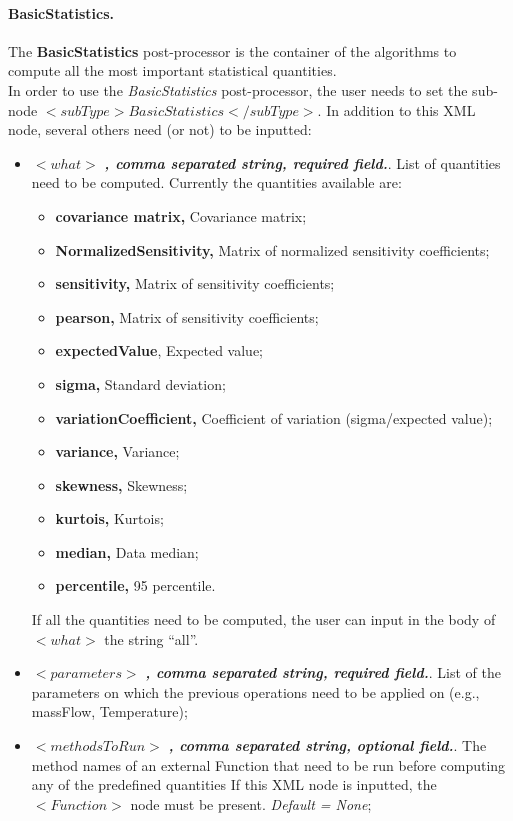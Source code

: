 \paragraph{BasicStatistics.}
\label{BasicStatistics}
The \textbf{BasicStatistics} post-processor is the container of the algorithms to compute all the most important statistical quantities. 
\\In order to use the   \textit{BasicStatistics} post-processor, the user needs to set the sub-node $<subType>BasicStatistics</subType>$. In addition to this XML node, several others need (or not) to be inputted:
\begin{itemize}
\item $<what>$ \textbf{\textit{, comma separated string, required field.}}.  List of quantities need to be computed. Currently the quantities available are:
\begin{itemize}
   \item \textbf{covariance matrix,} Covariance matrix;
   \item \textbf{NormalizedSensitivity,} Matrix of normalized sensitivity coefficients;
   \item \textbf{sensitivity,} Matrix of sensitivity coefficients;
   \item \textbf{pearson,} Matrix of sensitivity coefficients;
   \item \textbf{expectedValue}, Expected value;
   \item \textbf{sigma,} Standard deviation;
   \item \textbf{variationCoefficient,} Coefficient of variation (sigma/expected value);
   \item \textbf{variance,} Variance;
   \item \textbf{skewness,} Skewness;
   \item \textbf{kurtois,} Kurtois;
   \item \textbf{median,} Data median;
   \item \textbf{percentile,} 95 percentile.
\end{itemize}
If all the quantities need to be computed, the user can input in the body of $<what>$ the string ``all''.
\item $<parameters>$ \textbf{\textit{, comma separated string, required field.}}. List of the parameters on which the previous operations need to be applied on (e.g., massFlow, Temperature);
\item $<methodsToRun>$ \textbf{\textit{, comma separated string, optional field.}}.  The method names of an external Function that need to be run before computing any of the predefined quantities If this XML node is inputted, the $<Function>$ node must be present. \textit{Default = None};

\end{itemize}
